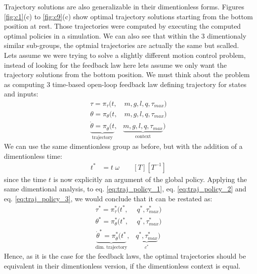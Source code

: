 Trajectory solutions are also generalizable in their dimentionless forms. Figures \ref{fig:c1}(c) to \ref{fig:c9}(c) show optimal trajectory solutions starting from the bottom position at rest. Those trajectories were computed  by executing the computed optimal policies in a simulation. We can also see that within the 3 dimentionaly similar sub-groups, the optmial trajectories are actually the same but scalled. Lets assume we were trying to solve a slightly different motion control problem, instead of looking for the feedback law here lets assume we only want the trajectory solutions from the bottom position. We must think about the problem as computing 3 time-based open-loop feedback law defining trajectory for states and inputs:
\begin{align}
\tau          = \pi_{\tau}( t , &
 \, m , g , l , q , \tau_{max} )  \label{eq:traj_policy_1}\\
\theta        = \pi_{\theta}( t ,&
 \, m , g , l , q , \tau_{max} )
\label{eq:traj_policy_2}\\
\underbrace{
\dot{\theta } = \pi_{\dot{\theta }}( t 
 }_{\text{trajectory}} ,&
\underbrace{
m , g , l , q , \tau_{max} 
 }_{\text{context}} )
 \label{eq:traj_policy_3}
\end{align}
We can use the same dimentionless group as before, but with the addition of a dimentionless time:
\begin{align}
t^* &= t \; \omega \quad \quad [T][T^{-1}]
\end{align}
since the time $t$ is now explicitly an argument of the global policy. Applying the same dimentional analysis, to eq. \eqref{eq:traj_policy_1}, eq. \eqref{eq:traj_policy_2} and eq. \eqref{eq:traj_policy_3}, we would conclude that it can be restated as:
\begin{align}
\tau^*          = \pi^*_{\tau}( t^* , &
 \, q^* , \tau_{max}^* )  \label{eq:dim_traj_policy_1}\\
\theta^*        = \pi^*_{\theta}( t^* ,&
 \, q^* , \tau_{max}^* )
\label{eq:dim_traj_policy_2}\\
\underbrace{
\dot{\theta }^* = \pi^*_{\dot{\theta }}( t^* 
}_{\text{dim. trajectory}} ,&
\underbrace{
 q^* , \tau_{max}^*
 }_{c^*} )
 \label{eq:dim_traj_policy_3}
\end{align}
Hence, as it is the case for the feedback laws, the optimal trajectories should be equivalent in their dimentionless version, if the dimentionless context is equal. 



